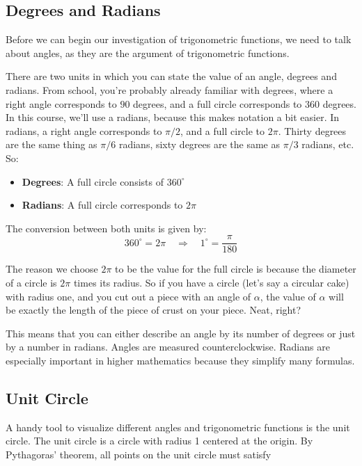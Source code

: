 \subsection{Degrees and Radians}

Before we can begin our investigation of trigonometric functions, we need to talk about angles, as they are the argument of trigonometric functions.

There are two units in which you can state the value of an angle, degrees and radians. From school, you're probably already familiar with degrees, where a right angle corresponds to $90$ degrees, and a full circle corresponds to $360$ degrees. In this course, we'll use a radians, because this makes notation a bit easier. In radians, a right angle corresponds to $\pi/2$, and a full circle to $2\pi$. Thirty degrees are the same thing as $\pi/6$ radians, sixty degrees are the same as $\pi/3$ radians, etc. So:

\begin{itemize}
    \item \textbf{Degrees}: A full circle consists of $360^\circ$
    \item \textbf{Radians}: A full circle corresponds to $2\pi$
\end{itemize}

The conversion between both units is given by:
\begin{equation}
    360^\circ = 2\pi \quad \Rightarrow \quad 1^\circ = \frac{\pi}{180}
\end{equation}

The reason we choose $2\pi$ to be the value for the full circle is because the diameter of a circle is $2\pi$ times its  radius. So if you have a circle (let's say a circular cake) with radius one, and you cut out a piece with an angle of $\alpha$, the value of $\alpha$ will be exactly the length of the piece of crust on your piece. Neat, right?

This means that you can either describe an angle by its number of degrees or just by a number in radians. Angles are measured counterclockwise. 
Radians are especially important in higher mathematics because they simplify many formulas.

\subsection{Unit Circle}
A handy tool to visualize different angles and trigonometric functions is the unit circle. The unit circle is a circle with radius 1 centered at the origin. 
By Pythagoras' theorem, all points on the unit circle must satisfy 

